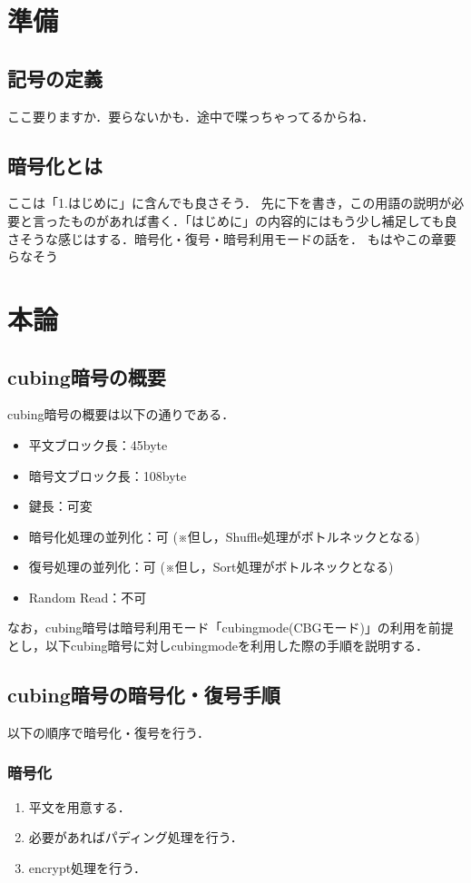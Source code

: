 \documentclass{jsarticle}
\begin{document}
\section{準備}
\subsection{記号の定義}
ここ要りますか．要らないかも．途中で喋っちゃってるからね．
\subsection{暗号化とは}
ここは「1.はじめに」に含んでも良さそう．
先に下を書き，この用語の説明が必要と言ったものがあれば書く．「はじめに」の内容的にはもう少し補足しても良さそうな感じはする．暗号化・復号・暗号利用モードの話を．
もはやこの章要らなそう

\section{本論}
\subsection{cubing暗号の概要}
cubing暗号の概要は以下の通りである．
\begin{itemize}
  \item 平文ブロック長：45byte
  \item 暗号文ブロック長：108byte
  \item 鍵長：可変
  \item 暗号化処理の並列化：可 (※但し，Shuffle処理がボトルネックとなる)
  \item 復号処理の並列化：可 (※但し，Sort処理がボトルネックとなる)
  \item Random Read：不可
\end{itemize}
なお，cubing暗号は暗号利用モード「cubingmode(CBGモード)」の利用を前提とし，以下cubing暗号に対しcubingmodeを利用した際の手順を説明する．
\subsection{cubing暗号の暗号化・復号手順}

以下の順序で暗号化・復号を行う．

\subsubsection{暗号化}
\begin{enumerate}
\item 平文を用意する．
\item 必要があればパディング処理を行う．
\item encrypt処理を行う．
\end{enumerate}
\end{document}
